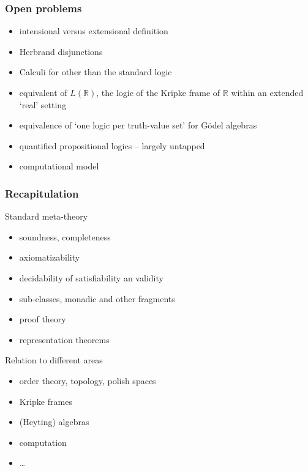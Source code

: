 \documentclass[aspectratio=169]%
  {beamer}
\newcommand{\bbR}{\mathbb{R}}
\newcommand{\sis}{\\[\medskipamount]}
\begin{document}
\begin{frame}
  \frametitle{Open problems}
  \begin{itemize}
  \item intensional versus extensional definition\sis
  \item Herbrand disjunctions\sis
  \item Calculi for other than the standard logic\sis
  \item equivalent of $L(\bbR)$, the logic of the Kripke frame of
    $\bbR$ within an extended `real' setting\sis
  \item equivalence of `one logic per truth-value set' for Gödel
    algebras\sis
  \item quantified propositional logics -- largely untapped\sis
  \item computational model
  \end{itemize}
\end{frame}

\begin{frame}
  \frametitle{Recapitulation}
  \pause
  \begin{block}{Standard meta-theory}
    \begin{itemize}
    \item soundness, completeness
    \item axiomatizability
    \item decidability of satisfiability an validity
    \item sub-classes, monadic and other fragments
    \item proof theory
    \item representation theorems
    \end{itemize}
  \end{block}

  \pause
  \begin{block}{Relation to different areas}
    \begin{itemize}
    \item order theory, topology, polish spaces
    \item Kripke frames
    \item (Heyting) algebras
    \item computation
    \item \ldots
    \end{itemize}
  \end{block}

\end{frame}
\end{document}
